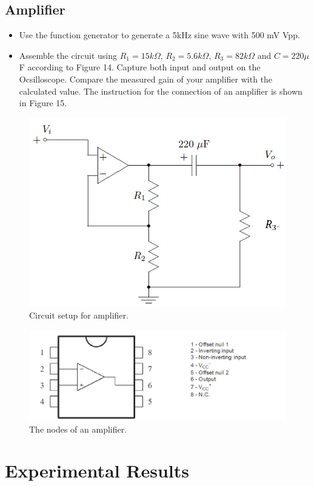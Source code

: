 \documentclass[a4paper]{article}
\begin{document}
\subsection{Amplifier}
\begin{itemize}
	\item Use the function generator to generate a 5kHz sine wave with 500 mV Vpp.
	\item Assemble the circuit using $R_1=15k\Omega$, $R_2=5.6k\Omega$, $R_3=82k\Omega$ and $C=220\mu$F according to Figure 14. Capture both input and output on the Ocsilloscope. Compare the measured gain of your amplifier with the calculated value. The instruction for the connection of an amplifier is shown in Figure 15.
\end{itemize}
\begin{figure}[H]
	\centering
	\includegraphics[width=0.7\linewidth]{14.jpg}
	\caption{Circuit setup for amplifier.}
\end{figure}
\begin{figure}[H]
	\centering
	\includegraphics[width=0.7\linewidth]{15.jpg}
	\caption{The nodes of an amplifier.}
\end{figure}
\section{Experimental Results}
\end{document}
